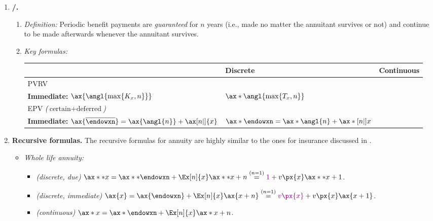 \begin{enumerate}
\item \textbf{/.}
\begin{enumerate}[label={(\arabic*)}]
\item \emph{Definition:} Periodic benefit payments are \emph{guaranteed} for \(n\) years
(i.e., made no matter the annuitant survives or not) and continue to be made
afterwards whenever the annuitant survives.
\item \emph{Key formulas:}
\begin{center}
\begin{tabular}{lll}
\toprule
&Discrete&Continuous \\
\midrule
PVRV&
\makecell[l]{
\textbf{Due:} \(\ax**{\angl{\max\{K_x+1,n\}}}\) \\
\textbf{Immediate:} \(\ax{\angl{\max\{K_x,n\}}}\)
}
&\(\ax*{\angl{\max\{T_x,n\}}}\)\\
\midrule
EPV \emph{(\(\text{certain}+\text{deferred}\))}&
\makecell[l]{\textbf{Due:} \(\ax**{\overline{\endowxn}}=\ax**{\angl{n}}+\ax**[n|]{x}\) \\
\textbf{Immediate:} \(\ax{\overline{\endowxn}}=\ax{\angl{n}}+\ax[n|]{x}\)
}
&\(\ax*{\endowxn}=\ax*{\angl{n}}+\ax*[n|]{x}\)\\
\bottomrule
\end{tabular}
\end{center}
\end{enumerate}
\item \label{it:annuity-recursions} \textbf{Recursive formulas.} The recursive
formulas for annuity are highly similar to the ones for insurance discussed in
.
\begin{itemize}
\item \emph{Whole life annuity:}
\begin{itemize}
\item \emph{(discrete, due)} \(\ax**{x}=\ax**{\endowxn}+\Ex[n]{x}\ax**{x+n}
\overset{(n=1)}{=}\vc{1}+v\px{x}\ax**{x+1}\).
\item \emph{(discrete, immediate)} \(\ax{x}=\ax{\endowxn}+\Ex[n]{x}\ax{x+n}
\overset{(n=1)}{=}\vc{v\px{x}}+v\px{x}\ax{x+1}\).
\item \emph{(continuous)} \(\ax*{x}=\ax*{\endowxn}+\Ex[n]{x}\ax*{x+n}\).
\end{itemize}
\begin{center}
\end{center}
\end{itemize}
\end{enumerate}
